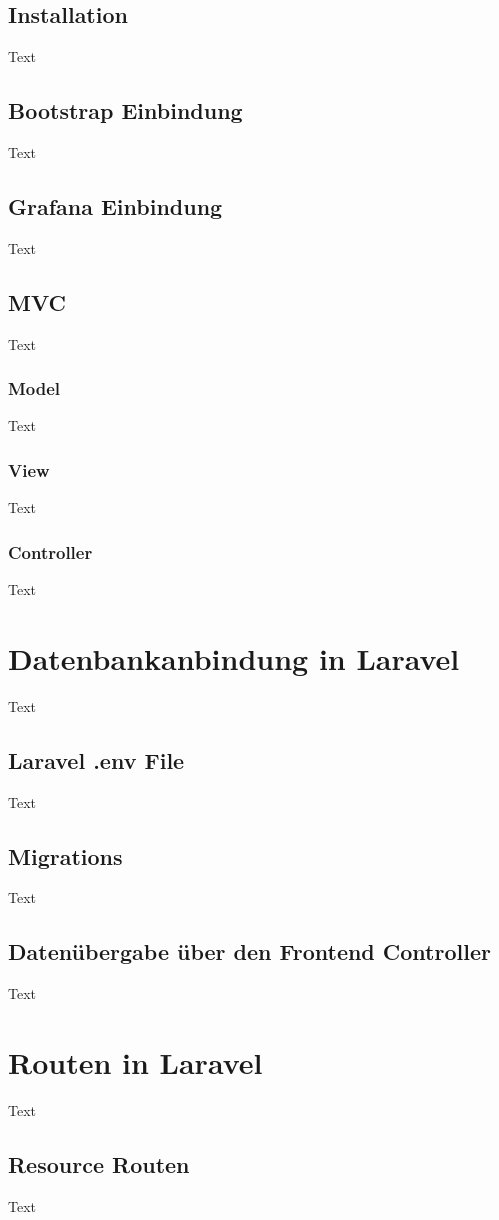 \subsection{Installation}
Text
\subsection{Bootstrap Einbindung}
Text
\subsection{Grafana Einbindung}
Text
\subsection{MVC}
Text
\subsubsection{Model}
Text
\subsubsection{View}
Text
\subsubsection{Controller}
Text

\section{Datenbankanbindung in Laravel}
Text
\subsection{Laravel .env File}
Text
\subsection{Migrations}
Text
\subsection{Datenübergabe über den Frontend Controller}
Text

\section{Routen in Laravel}
Text
\subsection{Resource Routen}
Text
